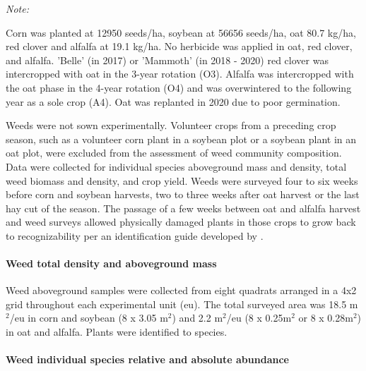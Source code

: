 \documentclass[
]{article}
\begin{document}
\begin{landscape}
\begin{table}
{\begin{threeparttable}
\begin{tabular}[t]
\hline
\end{tabular}
\begin{tablenotes}[para]
\item \textit{Note: } 
\item Corn was planted at 12950 seeds/ha, soybean at 56656 seeds/ha, oat 80.7 kg/ha, red clover and alfalfa at 19.1 kg/ha. No herbicide was applied in oat, red clover, and alfalfa. 'Belle' (in 2017) or 'Mammoth' (in 2018 - 2020) red clover was intercropped with oat in the 3-year rotation (O3). Alfalfa was intercropped with the oat phase in the 4-year rotation (O4) and was overwintered to the following year as a sole crop (A4). Oat was replanted in 2020 due to poor germination.
\end{tablenotes}
\end{threeparttable}}
\end{table}
\end{landscape}

Weeds were not sown experimentally. Volunteer crops from a preceding crop season, such as a volunteer corn plant in a soybean plot or a soybean plant in an oat plot, were excluded from the assessment of weed community composition. Data were collected for individual species aboveground mass and density, total weed biomass and density, and crop yield. Weeds were surveyed four to six weeks before corn and soybean harvests, two to three weeks after oat harvest or the last hay cut of the season. The passage of a few weeks between oat and alfalfa harvest and weed surveys allowed physically damaged plants in those crops to grow back to recognizability per an identification guide developed by \citet{uvaWeedsNortheast1997}.

\hypertarget{weed-total-density-and-aboveground-mass}{%
\paragraph*{Weed total density and aboveground mass}\label{weed-total-density-and-aboveground-mass}}

Weed aboveground samples were collected from eight quadrats arranged in a 4x2 grid throughout each experimental unit (eu). The total surveyed area was 18.5 m\(^2\)/eu in corn and soybean (8 x 3.05 m\(^2\)) and 2.2 m\(^2\)/eu (8 x 0.25m\(^2\) or 8 x 0.28m\(^2\)) in oat and alfalfa. Plants were identified to species.

\hypertarget{weed-individual-species-relative-and-absolute-abundance}{%
\paragraph*{Weed individual species relative and absolute abundance}\label{weed-individual-species-relative-and-absolute-abundance}}
\end{document}
